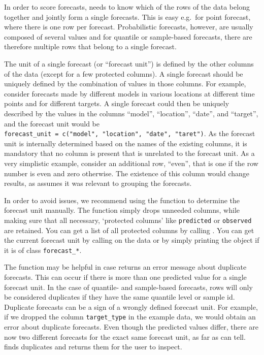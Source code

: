 \documentclass[
]{jss}
\begin{document}
In order to score forecasts,  needs to know which of
the rows of the data belong together and jointly form a single
forecasts. This is easy e.g.~for point forecast, where there is one row
per forecast. Probabilistic forecasts, however, are usually composed of
several values and for quantile or sample-based forecasts, there are
therefore multiple rows that belong to a single forecast.

The unit of a single forecast (or ``forecast unit'') is defined by the
other columns of the data (except for a few protected columns). A single
forecast should be uniquely defined by the combination of values in
those columns. For example, consider forecasts made by different models
in various locations at different time points and for different targets.
A single forecast could then be uniquely described by the values in the
columns ``model'', ``location'', ``date'', and ``target'', and the
forecast unit would be
\texttt{forecast\_unit\ =\ c("model",\ "location",\ "date",\ "taret")}.
As the forecast unit is internally determined based on the names of the
existing columns, it is mandatory that no column is present that is
unrelated to the forecast unit. As a very simplistic example, consider
an additional row, ``even'', that is one if the row number is even and
zero otherwise. The existence of this column would change results, as
 assumes it was relevant to grouping the forecasts.

In order to avoid issues, we recommend using the function
 to determine the forecast unit manually.
The function simply drops unneeded columns, while making sure that all
necessary, `protected columns' like \texttt{predicted} or
\texttt{observed} are retained. You can get a list of all protected
columns by calling . You can get the
current forecast unit by calling  on the
data or by simply printing the object if it is of class
\texttt{forecast\_*}.

The function  may be helpful in case
 returns an error message about duplicate
forecasts. This can occur if there is more than one predicted value for
a single forecast unit. In the case of quantile- and sample-based
forecasts, rows will only be considered duplicates if they have the same
quantile level or sample id. Duplicate forecasts can be a sign of a
wrongly defined forecast unit. For example, if we dropped the column
\texttt{target\_type} in the example data, we would obtain an error
about duplicate forecasts. Even though the predicted values differ,
there are now two different forecasts for the exact same forecast unit,
as far as  can tell.
 finds duplicates and returns them for
the user to inspect.
\end{document}
